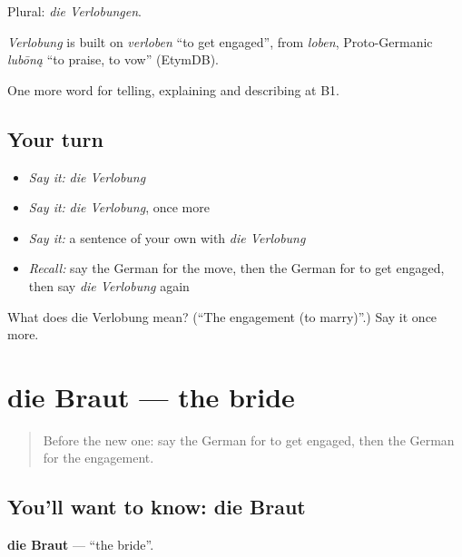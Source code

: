 Plural: \emph{die Verlobungen}.

\begin{cousinweb}
\emph{Verlobung} is built on \emph{verloben} \textquotedblleft{}to get engaged\textquotedblright{}, from \emph{loben}, Proto-Germanic \emph{lubōną} \textquotedblleft{}to praise, to vow\textquotedblright{} (EtymDB).
\end{cousinweb}

\begin{grammarlens}[title={What you've built}]
One more word for telling, explaining and describing at B1.
\end{grammarlens}

\subsection*{Your turn}
\begin{itemize}
\raggedright
  \item \emph{Say it:} \emph{die Verlobung}
  \item \emph{Say it:} \emph{die Verlobung}, once more
  \item \emph{Say it:} a sentence of your own with \emph{die Verlobung}
  \item \emph{Recall:} say the German for the move, then the German for to get engaged, then say \emph{die Verlobung} again
\end{itemize}

\begin{tcolorbox}[breakable,colback=teal!4,colframe=teal!35!black,title={Before you move on}]
What does die Verlobung mean? (\textquotedblleft{}The engagement (to marry)\textquotedblright{}.) Say it once more.
\end{tcolorbox}
\section[die Braut]{die Braut — the bride}

\label{lesson:GE-C298-braut}



\begin{quote}
Before the new one: say the German for to get engaged, then the German for the engagement.
\end{quote}

\subsection*{You'll want to know: die Braut}
\textbf{die Braut} — \textquotedblleft{}the bride\textquotedblright{}.

